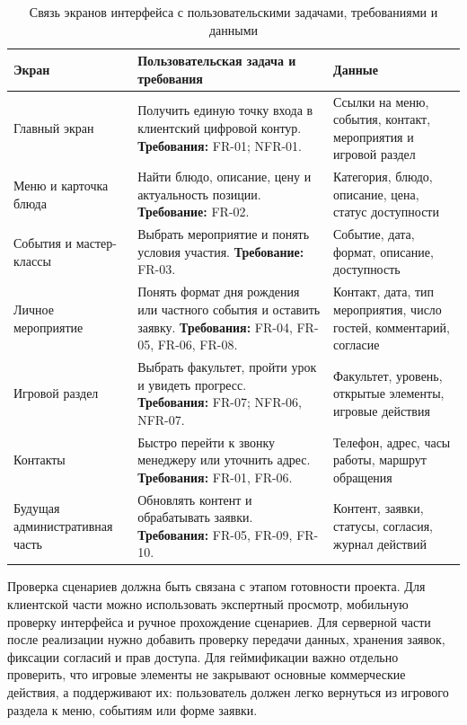 \begin{table}[H]
\centering
\small
\caption{Связь экранов интерфейса с пользовательскими задачами, требованиями и данными}
\label{tab:v2_screens_requirements_data}
\begin{tabularx}{\textwidth}{|>{\raggedright\arraybackslash}p{}|>{\raggedright\arraybackslash}p{}|>{\raggedright\arraybackslash}X|}
\hline
\textbf{Экран} & \textbf{Пользовательская задача и требования} & \textbf{Данные} \\ \hline
Главный экран & Получить единую точку входа в клиентский цифровой контур. \newline \textbf{Требования:} FR-01; NFR-01. & Ссылки на меню, события, контакт, мероприятия и игровой раздел \\ \hline
Меню и карточка блюда & Найти блюдо, описание, цену и актуальность позиции. \newline \textbf{Требование:} FR-02. & Категория, блюдо, описание, цена, статус доступности \\ \hline
События и мастер-классы & Выбрать мероприятие и понять условия участия. \newline \textbf{Требование:} FR-03. & Событие, дата, формат, описание, доступность \\ \hline
Личное мероприятие & Понять формат дня рождения или частного события и оставить заявку. \newline \textbf{Требования:} FR-04, FR-05, FR-06, FR-08. & Контакт, дата, тип мероприятия, число гостей, комментарий, согласие \\ \hline
Игровой раздел & Выбрать факультет, пройти урок и увидеть прогресс. \newline \textbf{Требования:} FR-07; NFR-06, NFR-07. & Факультет, уровень, открытые элементы, игровые действия \\ \hline
Контакты & Быстро перейти к звонку менеджеру или уточнить адрес. \newline \textbf{Требования:} FR-01, FR-06. & Телефон, адрес, часы работы, маршрут обращения \\ \hline
Будущая административная часть & Обновлять контент и обрабатывать заявки. \newline \textbf{Требования:} FR-05, FR-09, FR-10. & Контент, заявки, статусы, согласия, журнал действий \\ \hline
\end{tabularx}
\normalsize
\end{table}

Проверка сценариев должна быть связана с этапом готовности проекта. Для клиентской части можно использовать экспертный просмотр, мобильную проверку интерфейса и ручное прохождение сценариев. Для серверной части после реализации нужно добавить проверку передачи данных, хранения заявок, фиксации согласий и прав доступа. Для геймификации важно отдельно проверить, что игровые элементы не закрывают основные коммерческие действия, а поддерживают их: пользователь должен легко вернуться из игрового раздела к меню, событиям или форме заявки.


